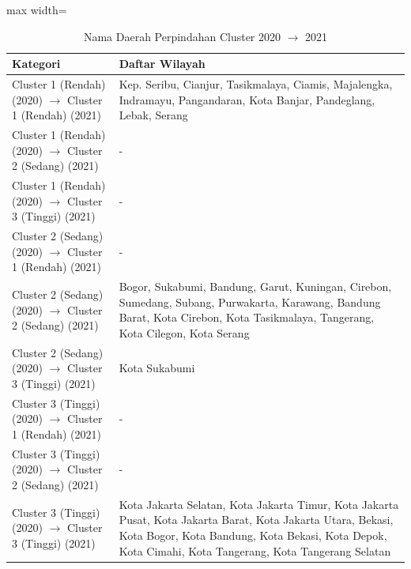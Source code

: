 \begin{table}[H]
\centering
\caption{Nama Daerah Perpindahan Cluster 2020 \(\rightarrow\) 2021} \makeatletter{}\makeatother
\begin{adjustbox}{max width=\textwidth}
\begin{tabular}{|p{4cm}|p{10cm}|}
\hline
\textbf{Kategori} & \textbf{Daftar Wilayah} \\
\hline
Cluster 1 (Rendah) (2020) \(\rightarrow\) Cluster 1 (Rendah) (2021) & Kep. Seribu, Cianjur, Tasikmalaya, Ciamis, Majalengka, Indramayu, Pangandaran, Kota Banjar, Pandeglang, Lebak, Serang \\
\hline
Cluster 1 (Rendah) (2020) \(\rightarrow\) Cluster 2 (Sedang) (2021) & - \\
\hline
Cluster 1 (Rendah) (2020) \(\rightarrow\) Cluster 3 (Tinggi) (2021) & - \\
\hline
Cluster 2 (Sedang) (2020) \(\rightarrow\) Cluster 1 (Rendah) (2021) & - \\
\hline
Cluster 2 (Sedang) (2020) \(\rightarrow\) Cluster 2 (Sedang) (2021) & Bogor, Sukabumi, Bandung, Garut, Kuningan, Cirebon, Sumedang, Subang, Purwakarta, Karawang, Bandung Barat, Kota Cirebon, Kota Tasikmalaya, Tangerang, Kota Cilegon, Kota Serang \\
\hline
Cluster 2 (Sedang) (2020) \(\rightarrow\) Cluster 3 (Tinggi) (2021) & Kota Sukabumi \\
\hline
Cluster 3 (Tinggi) (2020) \(\rightarrow\) Cluster 1 (Rendah) (2021) & - \\
\hline
Cluster 3 (Tinggi) (2020) \(\rightarrow\) Cluster 2 (Sedang) (2021) & - \\
\hline
Cluster 3 (Tinggi) (2020) \(\rightarrow\) Cluster 3 (Tinggi) (2021) & Kota Jakarta Selatan, Kota Jakarta Timur, Kota Jakarta Pusat, Kota Jakarta Barat, Kota Jakarta Utara, Bekasi, Kota Bogor, Kota Bandung, Kota Bekasi, Kota Depok, Kota Cimahi, Kota Tangerang, Kota Tangerang Selatan \\
\hline
\end{tabular}
\end{adjustbox}
\end{table}